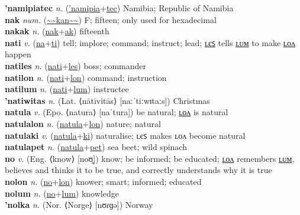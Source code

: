 \textbf{'namipiatec} \textit{n.} (\hyperref['namipia]{'namipia}+\hyperref[tec]{tec})
Namibia; Republic of Namibia \label{'namipiatec} \\
\textbf{nak} \textit{num.} (\hyperref[kan]{\~{}\~{}kan\~{}\~{}})
F; fifteen; only used for hexadecimal \label{nak} \\
\textbf{nakak} \textit{n.} (\hyperref[nak]{nak}+\hyperref[ak]{ak})
fifteenth \label{nakak} \\
\textbf{nati} \textit{v.} (\hyperref[na]{na}+\hyperref[ti]{ti})
tell; implore; command; instruct; lead; \hyperref[natiles]{ʟєꜱ} tells \hyperref[natilum]{ʟᴜᴍ} to make \hyperref[natilon]{ʟᴏᴧ} happen \label{nati} \\
\textbf{natiles} \textit{n.} (\hyperref[nati]{nati}+\hyperref[les]{les})
boss; commander \label{natiles} \\
\textbf{natilon} \textit{n.} (\hyperref[nati]{nati}+\hyperref[lon]{lon})
command; instruction \label{natilon} \\
\textbf{natilum} \textit{n.} (\hyperref[nati]{nati}+\hyperref[lum]{lum})
instructee \label{natilum} \\
\textbf{'natiwitas} \textit{n.} (Lat. ⟨nātīvitās⟩ [naːˈtiːwɪtaːs])
Christmas \label{'natiwitas} \\
\textbf{natula} \textit{v.} (Epo. ⟨natura⟩ [naˈtura])
be natural; \hyperref[natulalon]{ʟᴏᴧ} is natural \label{natula} \\
\textbf{natulalon} \textit{n.} (\hyperref[natula]{natula}+\hyperref[lon]{lon})
nature; natural \label{natulalon} \\
\textbf{natulaki} \textit{v.} (\hyperref[natula]{natula}+\hyperref[ki]{ki})
naturalise; ʟєꜱ makes ʟᴏᴧ become natural \label{natulaki} \\
\textbf{natulapet} \textit{n.} (\hyperref[natula]{natula}+\hyperref[pet]{pet})
sea beet; wild spinach \label{natulapet} \\
\textbf{no} \textit{v.} (Eng. ⟨know⟩ [noʊ̯])
know; be informed; be educated; \hyperref[nolon]{ʟᴏᴧ} remembers \hyperref[nolum]{ʟᴜᴍ}, believes and thinks it to be true, and correctly understands why it is true \label{no} \\
\textbf{nolon} \textit{n.} (\hyperref[no]{no}+\hyperref[lon]{lon})
knower; smart; informed; educated \label{nolon} \\
\textbf{nolum} \textit{n.} (\hyperref[no]{no}+\hyperref[lum]{lum})
knowledge \label{nolum} \\
\textbf{'nolka} \textit{n.} (Nor. ⟨Norge⟩ [nʊɾɡə])
Norway \label{'nolka} \\
